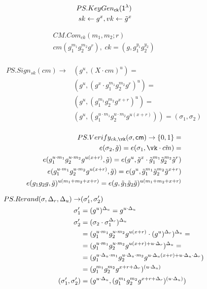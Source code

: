\[
\begin{aligned}
    PS.KeyGen_{\mathsf{ck}}(\mathsf{1^{\lambda}})\\
    sk \gets g^x, vk \gets \tilde{g}^x \\
 \end{aligned}
\] 


\[
\begin{aligned}
    CM.Com_{ck}(m_1, m_2; r) \\
    cm(g_1^{m_1} g_2^{m_2}g^r), \; ck = (g, g_1^{y_1}g_2^{y_2}) \\
 \end{aligned}
\]    

\[
\begin{aligned}
    PS.Sign_{sk}(cm) \to& (g^u, (X \cdot cm)^u) = \\
        &(g^u, (g^x \cdot g_1^{m_1} g_2^{m_2}g^r)^u) =\\
        &(g^u, (g_1^{m_1} g_2^{m_2}g^{x+r})^u)  =\\
        &(g^u, (g_1^{u \cdot m_1} g_2^{u \cdot m_2}g^{u(x+r)})) = (\sigma_1, \sigma_2)\\      
 \end{aligned}
\] 

\[
\begin{aligned}
    PS.Verify_{ck,\vk}(\sigma, \cm) \to \bit =\\
    e(\sigma_2, \tilg) = e(\sigma_1, \vk \cdot \tilcm) = \\
    e(g_1^{u \cdot m_1} g_2^{u \cdot m_2}g^{u(x+r)}, \tilg) = e(g^u, \tilg^x \cdot \tilg_1^{m_1} \tilg_2^{m_2}\tilg^r) \\
        e(g_1^{u \cdot m_1} g_2^{u \cdot m_2}g^{u(x+r)}, \tilg) = e(g^u, \tilg_1^{m_1} \tilg_2^{m_2}\tilg^{x + r}) \\
        e(g_1g_2g, \tilg)^{u(m_1 + m_2 + x + r)} = e(g, \tilg_1\tilg_2\tilg)^{u (m_1 + m_2 + x + r)} \\
 \end{aligned}
\] 

\[
\begin{aligned}
        PS.Rerand(\sigma, \Delta_r, \Delta_u) \to&  (\sigma_1', \sigma_2') \\
        \sigma_1' &= (g^u)^{\Delta_u} = g^{u \cdot \Delta_u} \\
        \sigma_2' &= (\sigma_2 \cdot \sigma_1^{\Delta_r})^{\Delta_u} \\
        &   = (g_1^{u \cdot m_1} g_2^{u \cdot m_2}g^{u(x+r)} \cdot (g^u)^{\Delta_r})^{\Delta_u} = \\
        &   = (g_1^{u \cdot m_1} g_2^{u \cdot m_2}g^{u(x+r) + u \cdot \Delta_r})^{\Delta_u} = \\
        &   = (g_1^{u \cdot \Delta_u \cdot m_1} g_2^{u \cdot \Delta_u \cdot m_2}g^{u \cdot \Delta_u (x+r) + u \cdot \Delta_u \cdot \Delta_r}) \\
        &   = (g_1^{m_1} g_2^{m_2}g^{x+r + \Delta_r})^{(u \cdot \Delta_u )} \\
        (\sigma_1', \sigma_2') &   = (g^{u \cdot \Delta_u}, (g_1^{m_1} g_2^{m_2}g^{x+r + \Delta_r})^{(u \cdot \Delta_u )}) \\
 \end{aligned}
\]

